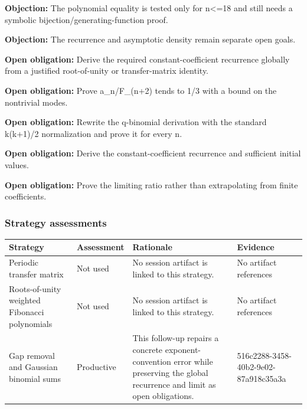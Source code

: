 \documentclass[11pt]{article}
\begin{document}
\textbf{Objection:} The polynomial equality is tested only for n\textless{}=18 and still needs a symbolic bijection/generating-function proof.\par
\textbf{Objection:} The recurrence and asymptotic density remain separate open goals.\par
\textbf{Open obligation:} Derive the required constant-coefficient recurrence globally from a justified root-of-unity or transfer-matrix identity.\par
\textbf{Open obligation:} Prove a\_n/F\_(n+2) tends to 1/3 with a bound on the nontrivial modes.\par
\textbf{Open obligation:} Rewrite the q-binomial derivation with the standard k(k+1)/2 normalization and prove it for every n.\par
\textbf{Open obligation:} Derive the constant-coefficient recurrence and sufficient initial values.\par
\textbf{Open obligation:} Prove the limiting ratio rather than extrapolating from finite coefficients.\par
\subsubsection*{Strategy assessments}
\begin{longtable}{>{\raggedright\arraybackslash}p{.16\linewidth}>{\raggedright\arraybackslash}p{.15\linewidth}>{\raggedright\arraybackslash}p{.40\linewidth}>{\raggedright\arraybackslash}p{.17\linewidth}}
\toprule Strategy & Assessment & Rationale & Evidence \\
\midrule\endhead
Periodic transfer matrix & Not used & No session artifact is linked to this strategy. & No artifact references \\
Roots-of-unity weighted Fibonacci polynomials & Not used & No session artifact is linked to this strategy. & No artifact references \\
Gap removal and Gaussian binomial sums & Productive & This follow-up repairs a concrete exponent-convention error while preserving the global recurrence and limit as open obligations. & 516c2288-3458-40b2-9e02-87a918c35a3a \\
\bottomrule
\end{longtable}
\end{document}
